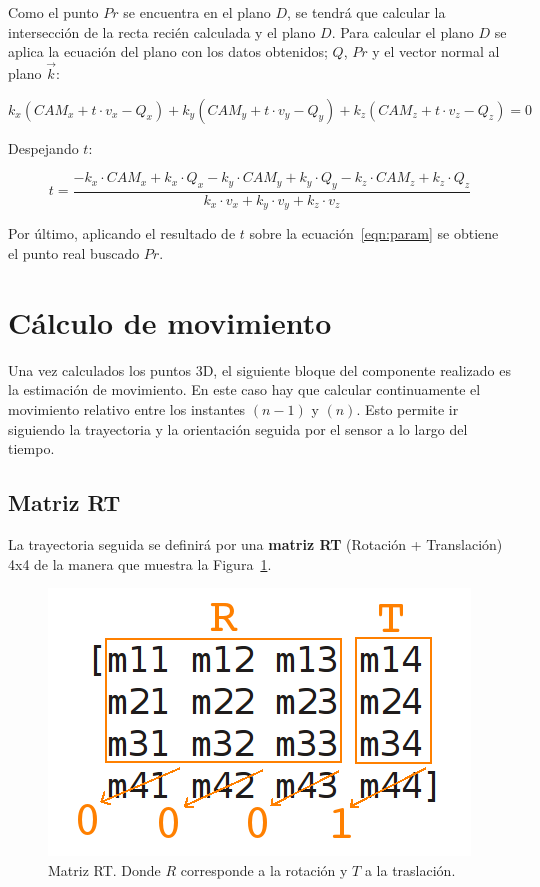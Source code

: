Como el punto $Pr$ se encuentra en el plano $D$, se tendrá que calcular la intersección de la recta recién calculada y el plano $D$. Para calcular el plano $D$ se aplica la ecuación del plano con los datos obtenidos; $Q$, $Pr$ y el vector normal al plano $\vec{k}$:

\begin{equation}
k_{x}(CAM_{x}+t\cdot v_{x}-Q_{x})+k_{y}(CAM_{y}+t\cdot v_{y}-Q_{y})+k_{z}(CAM_{z}+t\cdot v_{z}-Q_{z})=0
\end{equation}

Despejando $t$:

\begin{equation}
t=\frac{-k_{x}\cdot CAM_{x}+k_{x}\cdot Q_{x}-k_{y}\cdot CAM_{y}+k_{y}\cdot Q_{y}-k_{z}\cdot CAM_{z}+k_{z}\cdot Q_{z}}{k_{x}\cdot v_{x}+k_{y}\cdot v_{y}+k_{z}\cdot v_{z}}
\end{equation}

Por último, aplicando el resultado de $t$ sobre la ecuación~\ref{eqn:param} se obtiene el punto real buscado $Pr$.

\section{Cálculo de movimiento}

Una vez calculados los puntos 3D, el siguiente bloque del componente realizado es la estimación de movimiento. En este caso hay que calcular continuamente el movimiento relativo entre los instantes $(n-1)$ y $(n)$. Esto permite ir siguiendo la trayectoria y la orientación seguida por el sensor a lo largo del tiempo.

\subsection{Matriz RT}

La trayectoria seguida se definirá por una \textbf{matriz RT} (Rotación + Translación) 4x4 de la manera que muestra la Figura~\ref{fig:matrixRT}.

\begin{figure}[th]
\centering
\includegraphics[scale=0.5]{Figures/matrixRT.png}
\decoRule
\caption[matrix-rt]{Matriz RT. Donde $R$ corresponde a la rotación y $T$ a la traslación.}
\label{fig:matrixRT}
\end{figure}

